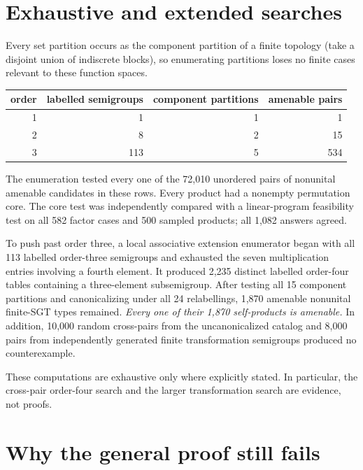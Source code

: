 \documentclass[11pt]{article}
\begin{document}
\section{Exhaustive and extended searches}

Every set partition occurs as the component partition of a finite topology
(take a disjoint union of indiscrete blocks), so enumerating partitions loses
no finite cases relevant to these function spaces.

\begin{center}
\begin{tabular}{@{}rrrr@{}}
\toprule
order & labelled semigroups & component partitions & amenable pairs\\
\midrule
1 & 1 & 1 & 1\\
2 & 8 & 2 & 15\\
3 & 113 & 5 & 534\\
\bottomrule
\end{tabular}
\end{center}

The enumeration tested every one of the 72,010 unordered pairs of nonunital
amenable candidates in these rows.  Every product had a nonempty permutation
core.  The core test was independently compared with a linear-program
feasibility test on all 582 factor cases and 500 sampled products; all 1,082
answers agreed.

To push past order three, a local associative extension enumerator began with
all 113 labelled order-three semigroups and exhausted the seven multiplication
entries involving a fourth element.  It produced 2,235 distinct labelled
order-four tables containing a three-element subsemigroup.  After testing all
15 component partitions and canonicalizing under all 24 relabellings, 1,870
amenable nonunital finite-SGT types remained.  \emph{Every one of their 1,870
self-products is amenable.}  In addition, 10,000 random cross-pairs from the
uncanonicalized catalog and 8,000 pairs from independently generated finite
transformation semigroups produced no counterexample.

These computations are exhaustive only where explicitly stated.  In
particular, the cross-pair order-four search and the larger transformation
search are evidence, not proofs.

\section{Why the general proof still fails}
\end{document}
